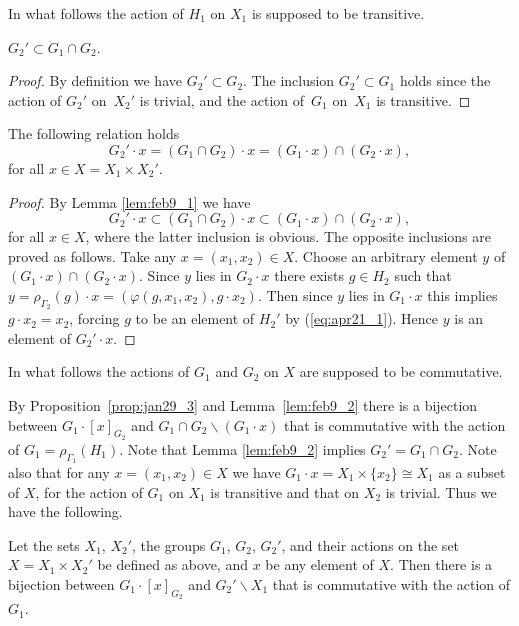 \documentclass[pdftex]{sigma}
\begin{document}
In what follows the action of $H_1$ on $X_1$ is supposed to be transitive.
\begin{lemma}\label{lem:feb9_1}
$G_2' \subset G_1 \cap G_2$.
\end{lemma}

\begin{proof}
By def\/inition we have $G_2' \subset G_2$.
The inclusion $G_2' \subset G_1$ holds since the action of $G_2'$
on~$X_2'$ is trivial, and the action of~$G_1$ on~$X_1$ is transitive.
\end{proof}

\begin{lemma}\label{lem:feb9_2}
The following relation holds
\begin{displaymath}
G_2' \cdot x = (G_1 \cap G_2) \cdot x =
(G_1 \cdot x) \cap (G_2 \cdot x),
\end{displaymath}
for all $x \in X= X_1 \times X_2'$.
\end{lemma}
\begin{proof}
By Lemma \ref{lem:feb9_1} we have
\begin{displaymath}
G_2' \cdot x \subset (G_1 \cap G_2) \cdot x \subset
(G_1 \cdot x) \cap (G_2 \cdot x),
\end{displaymath}
for all $x \in X$,
where the latter inclusion is obvious.
The opposite inclusions are proved as follows.
Take any $x = (x_1, x_2) \in X$.
Choose an arbitrary element $y$ of $(G_1 \cdot x) \cap (G_2 \cdot x)$.
Since $y$ lies in $G_2 \cdot x$ there exists $g \in H_2$ such that
$y = \rho_{\varGamma_2} (g) \cdot x = (\varphi (g, x_1,x_2), g \cdot x_2)$.
Then since $y$ lies in $G_1 \cdot x$ this implies $g \cdot x_2 = x_2$, forcing
$g$ to be an element of $H_2'$ by (\ref{eq:apr21_1}).
Hence $y$ is an element of $G_2' \cdot x$.
\end{proof}

In what follows the actions of $G_1$ and $G_2$ on $X$ are supposed to be commutative.

By Proposition~\ref{prop:jan29_3} and Lemma~\ref{lem:feb9_2}
there is a bijection between $G_1 \cdot [x]_{G_2}$ and $G_1 \cap G_2 \backslash (G_1 \cdot x)$
that is commutative with the action of $G_1= \rho_{\varGamma_1} (H_1)$.
Note that Lemma \ref{lem:feb9_2} implies $G_2' = G_1 \cap G_2$.
Note also that for any $x =(x_1,x_2) \in X$ we have
$G_1 \cdot x = X_1 \times \{ x_2 \} \cong X_1$ as a subset of $X$, for
the action of $G_1$ on $X_1$ is transitive and that on $X_2$ is trivial.
Thus we have the following.

\begin{theorem}\label{th:apr10_1}
Let the sets $X_1$, $X_2'$,
the groups $G_1$, $G_2$, $G_2'$, and their actions on the set $X= X_1 \times X_2'$ be defined as above, and $x$ be any element of $X$.
Then there is a bijection between $G_1 \cdot [x]_{G_2}$ and $G_2' \backslash X_1$ that is commutative with the action of $G_1$.
\end{theorem}
\end{document}
